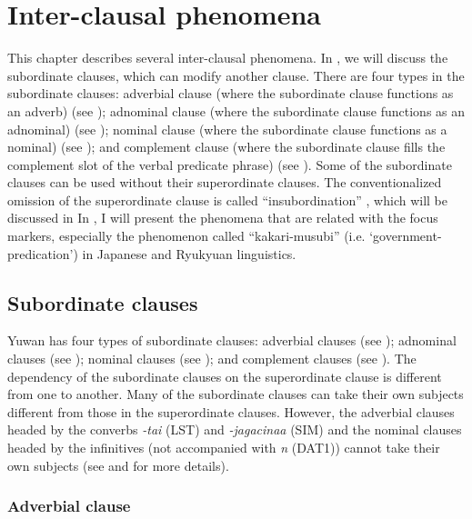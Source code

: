 \chapter{Inter-clausal phenomena}

This chapter describes several inter-clausal phenomena. In , we will discuss the subordinate clauses, which can modify another clause. There are four types in the subordinate clauses: adverbial clause (where the subordinate clause functions as an adverb) (see ); adnominal clause (where the subordinate clause functions as an adnominal) (see ); nominal clause (where the subordinate clause functions as a nominal) (see ); and complement clause (where the subordinate clause fills the complement slot of the verbal predicate phrase) (see ). Some of the subordinate clauses can be used without their superordinate clauses. The conventionalized omission of the superordinate clause is called “insubordination” \citep{Evans2007}, which will be discussed in  In , I will present the phenomena that are related with the focus markers, especially the phenomenon called “kakari-musubi” (i.e. ‘government-predication’) in Japanese and Ryukyuan linguistics.

\section{Subordinate clauses}\label{sec:11.1}

Yuwan has four types of subordinate clauses: adverbial clauses (see ); adnominal clauses (see ); nominal clauses (see ); and complement clauses (see ). The dependency of the subordinate clauses on the superordinate clause is different from one to another. Many of the subordinate clauses can take their own subjects different from those in the superordinate clauses. However, the adverbial clauses headed by the converbs \textit{{}-tai} (LST) and \textit{{}-jagacinaa} (SIM) and the nominal clauses headed by the infinitives (not accompanied with \textit{n} (DAT1)) cannot take their own subjects (see  and  for more details).

\subsection{Adverbial clause}\label{sec:11.1.1}

